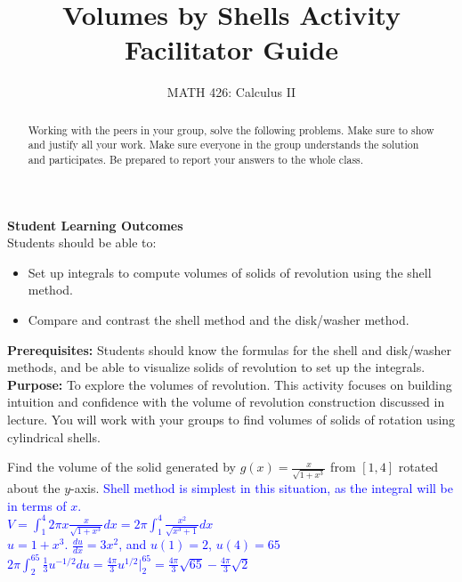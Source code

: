 \documentclass{ximera}
\title{Volumes by Shells Activity Facilitator Guide}
\author{MATH 426: Calculus II}
\begin{document}
\begin{abstract}
   Working with the peers in your group, solve the following problems. Make sure to show and justify all your work. Make sure everyone in the group understands the solution and participates. Be prepared to report your answers to the whole class. 
\end{abstract}
\maketitle

\textbf{Student Learning Outcomes}\\
Students should be able to:
\begin{itemize}
    \item Set up integrals to compute volumes of solids of revolution using the shell method.
    \item Compare and contrast the shell method and the disk/washer method.
\end{itemize}
\textbf{Prerequisites:} Students should know the formulas for the shell and disk/washer methods, and be able to visualize solids of revolution to set up the integrals. 
\textbf{Purpose: }To explore the volumes of revolution. This activity focuses on building intuition and confidence with the volume of revolution construction discussed in lecture. You will work with your groups to find volumes of solids of rotation using cylindrical shells.\\

\begin{exercise}
    Find the volume of the solid generated by $g(x)=\frac{x}{\sqrt{1+x^3}}$ from $[1,4]$ rotated about the $y$-axis.
    \textcolor{blue}{{Shell method is simplest in this situation, as the integral will be in terms of $x$. \\
$V=\displaystyle \int_1^4 2\pi x\frac{x}{\sqrt{1+x^3}}dx=2\pi\int_1^4 \frac{x^2}{\sqrt{x^3+1}}dx$\\
$u=1+x^3$. $\frac{du}{dx}=3x^2$, and $u(1)=2$, $u(4)=65$\\
$2\pi \displaystyle \int_2^{65}\frac{1}{3}u^{-1/2}du=\frac{4\pi}{3}u^{1/2}\bigg|_2^{65}=\frac{4\pi}{3}\sqrt{65}-\frac{4\pi}{3}\sqrt{2}$}}
\end{exercise}
\end{document}
